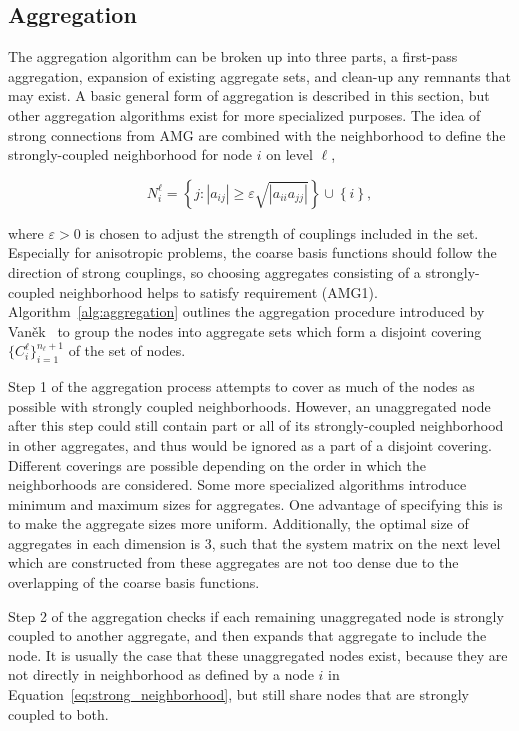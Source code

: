 \subsection{Aggregation}
The aggregation algorithm can be broken up into three parts, a first-pass aggregation, expansion of existing aggregate sets, and clean-up any remnants that may exist. A basic general form of aggregation is described in this section, but other aggregation algorithms exist for more specialized purposes. The idea of strong connections from AMG are combined with the neighborhood to define the strongly-coupled neighborhood for node $i$ on level $\ell$,

\begin{equation}
	\label{eq:strong_neighborhood}
	N_i^\ell = \left\{ j : |a_{ij}| \geq \varepsilon \sqrt{|a_{ii} a_{jj} |} \right\} \cup \left\{ i \right\},
\end{equation}

where $\varepsilon > 0$ is chosen to adjust the strength of couplings included in the set. Especially for anisotropic problems, the coarse basis functions should follow the direction of strong couplings, so choosing aggregates consisting of a strongly-coupled neighborhood helps to satisfy requirement (AMG1). Algorithm~\ref{alg:aggregation} outlines the aggregation procedure introduced by Van\v{e}k~\cite{Vanek1996_unstruc} to group the nodes into aggregate sets which form a disjoint covering $\{C_i^\ell\}_{i=1}^{n_\ell + 1}$ of the set of nodes.

Step 1 of the aggregation process attempts to cover as much of the nodes as possible with strongly coupled neighborhoods. However, an unaggregated node after this step could still contain part or all of its strongly-coupled neighborhood in other aggregates, and thus would be ignored as a part of a disjoint covering. Different coverings are possible depending on the order in which the neighborhoods are considered. Some more specialized algorithms introduce minimum and maximum sizes for aggregates. One advantage of specifying this is to make the aggregate sizes more uniform. Additionally, the optimal size of aggregates in each dimension is 3, such that the system matrix on the next level which are constructed from these aggregates are not too dense due to the overlapping of the coarse basis functions.

Step 2 of the aggregation checks if each remaining unaggregated node is strongly coupled to another aggregate, and then expands that aggregate to include the node. It is usually the case that these unaggregated nodes exist, because they are not directly in neighborhood as defined by a node $i$ in Equation~\ref{eq:strong_neighborhood}, but still share nodes that are strongly coupled to both.

